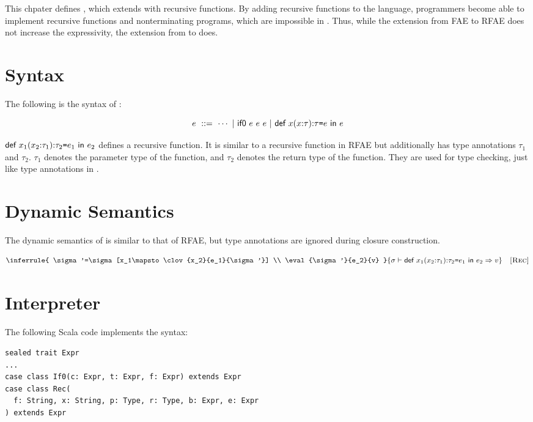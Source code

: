 This chpater defines \lang, which extends \plang with recursive functions. By
adding recursive functions to the language, programmers become able to implement
recursive functions and nonterminating programs, which are impossible in \plang.
Thus, while the extension from \textsf{FAE} to \textsf{RFAE} does not increase
the expressivity, the extension from \plang to \lang does.

\section{Syntax}

The following is the syntax of \lang:

\[
e\ ::=\ \cdots
\ | \ \textsf{if0}\ e\ e\ e
\ | \ \textsf{def}\ x(x{:}\tau){:}\tau\texttt{=} e\ \textsf{in}\ e
\]

$\textsf{def}\ x_1(x_2{:}\tau_1){:}\tau_2\texttt{=} e_1\ \textsf{in}\ e_2$ defines a recursive
function. It is similar to a recursive function in \textsf{RFAE} but
additionally has
type annotations $\tau_1$ and $\tau_2$. $\tau_1$ denotes the parameter type of the
function, and $\tau_2$ denotes the return type of the function. They are
used for type checking, just like type annotations in \plang.

\section{Dynamic Semantics}

The dynamic semantics of \lang is similar to that of \textsf{RFAE}, but type
annotations are ignored during closure construction.


\vspace{-1em}

\[
  \inferrule
  {
    \sigma'=\sigma[x_1\mapsto\clov{x_2}{e_1}{\sigma'}] \\
    \eval{\sigma'}{e_2}{v}
  }
  { \evald{\erect{x_1}{x_2}{\tau_1}{\tau_2}{e_1}{e_2}}{v} }
  \quad\textsc{[Rec]}
\]

\section{Interpreter}

The following Scala code implements the syntax:

\begin{verbatim}
sealed trait Expr
...
case class If0(c: Expr, t: Expr, f: Expr) extends Expr
case class Rec(
  f: String, x: String, p: Type, r: Type, b: Expr, e: Expr
) extends Expr
\end{verbatim}

